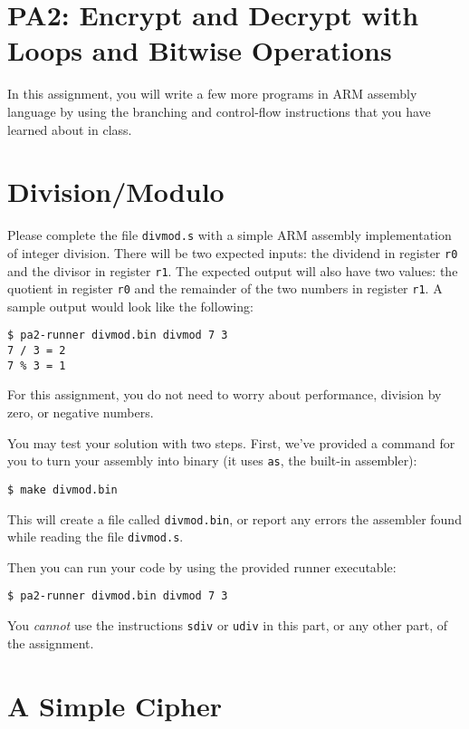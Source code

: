 \documentclass{article}
\def\r#1{\texttt{r#1}}
\begin{document}
\section{PA2: Encrypt and Decrypt with Loops and Bitwise Operations}

In this assignment, you will write a few more programs in ARM assembly 
language by using the branching and control-flow instructions that you 
have learned about in class. 

\section{Division/Modulo}

Please complete the file \texttt{divmod.s} with a simple ARM assembly
implementation of integer division. There will be two expected inputs: the
dividend in register \r{0} and the divisor in register \r{1}. The expected
output will also have two values: the quotient in register \r{0} and the
remainder of the two numbers in register \r{1}. A sample output would look like
the following:

\begin{verbatim}
$ pa2-runner divmod.bin divmod 7 3
7 / 3 = 2
7 % 3 = 1
\end{verbatim}

For this assignment, you do not need to worry about performance, division by
zero, or negative numbers.

You may test your solution with two steps. First, we've provided a command for
you to turn your assembly into binary (it uses {\tt as}, the built-in
assembler):

\begin{verbatim}
$ make divmod.bin
\end{verbatim}

This will create a file called {\tt divmod.bin}, or report any errors the
assembler found while reading the file {\tt divmod.s}.

Then you can run your code by using the provided runner executable:

\begin{verbatim}
$ pa2-runner divmod.bin divmod 7 3
\end{verbatim}

You \emph{cannot} use the instructions {\tt sdiv} or {\tt udiv} in this part,
or any other part, of the assignment.

\section{A Simple Cipher}
\end{document}
